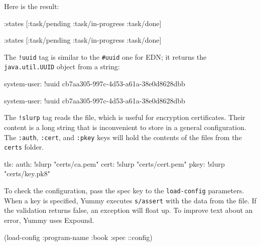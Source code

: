 \noindent
Here is the result:

\ifx\DEVICETYPE\MOBILE

\begin{clojure}
{:states [:task/pending
          :task/in-progress
          :task/done]}
\end{clojure}

\else

\begin{clojure}
{:states [:task/pending :task/in-progress :task/done]}
\end{clojure}

\fi

The \verb|!uuid| tag is similar to the \verb|#uuid| one for EDN; it returns the \verb|java.util.UUID| object from a string:

\ifx\DEVICETYPE\MOBILE

\begin{yaml}
system-user: !uuid
    cb7aa305-997c-4d53-a61a-38e0d8628dbb
\end{yaml}

\else

\begin{yaml}
system-user: !uuid cb7aa305-997c-4d53-a61a-38e0d8628dbb
\end{yaml}

\fi

The \verb|!slurp| tag reads the file, which is useful for encryption certificates. Their content is a long string that is inconvenient to store in a general configuration. The \verb|:auth|, \verb|:cert|, and \verb|:pkey| keys will hold the contents of the files from the \verb|certs| folder.

\begin{yaml}
tls:
  auth: !slurp "certs/ca.pem"
  cert: !slurp "certs/cert.pem"
  pkey: !slurp "certs/key.pk8"
\end{yaml}


To check the configuration, pass the spec key to the \verb|load-config| parameters. When a key is specified, Yummy executes \verb|s/assert| with the data from the file. If the validation returns false, an exception will float up. To improve text about an error, Yummy uses Expound.

\begin{clojure}
(load-config {:program-name :book
              :spec ::config})
\end{clojure}


